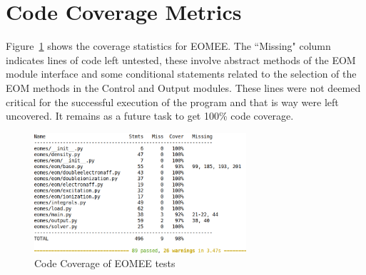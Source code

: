 \documentclass[12pt, titlepage]{article}
\begin{document}
\section{Code Coverage Metrics}
Figure~\ref{coverage} shows the coverage statistics for EOMEE. The ``Missing" 
column indicates lines of code left untested, these involve abstract methods of 
the EOM module interface and some conditional statements related to the 
selection of the EOM methods in the Control and Output modules. These lines 
were not deemed critical for the successful execution of the program and that 
is 
way were left uncovered. It remains as a future task to get 100\% code 
coverage.
\begin{figure}[h!]
	\centering
	\includegraphics[width=0.7\textwidth]{coverage.png}
	\caption{Code Coverage of EOMEE tests}
	\label{coverage}
\end{figure}




\end{document}
